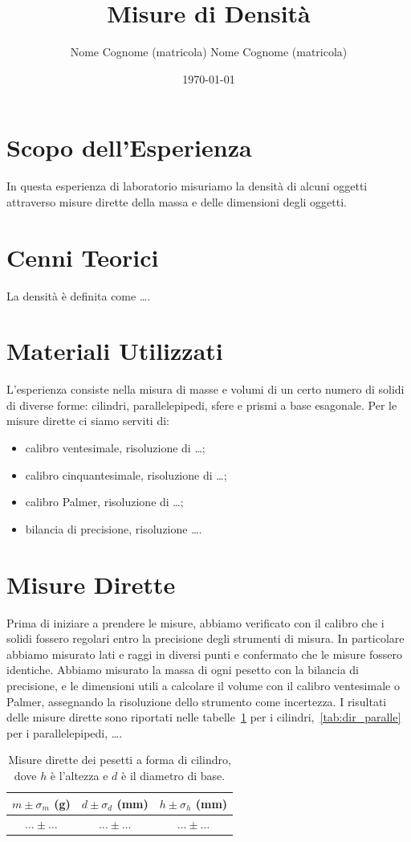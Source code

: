 \documentclass{article}
\title{Misure di Densit\`a}
\author{Nome Cognome (matricola)\quad
        Nome Cognome (matricola)}
\date{\today}
\begin{document}
\maketitle
\section{Scopo dell'Esperienza}
In questa esperienza di laboratorio misuriamo la densit\`a di alcuni oggetti attraverso misure dirette della massa e delle dimensioni degli oggetti.

\section{Cenni Teorici}
La densit\`a \`e definita come \ldots.

\section{Materiali Utilizzati}
L'esperienza consiste nella misura di masse e volumi di un certo numero di solidi di diverse forme: cilindri, parallelepipedi, sfere e prismi a base esagonale. Per le misure dirette ci siamo serviti di:
\begin{itemize}
    \item calibro ventesimale, risoluzione di \ldots;
    \item calibro cinquantesimale, risoluzione di \ldots;
    \item calibro Palmer, risoluzione di \ldots;
    \item bilancia di precisione, risoluzione \ldots.
\end{itemize}
\section{Misure Dirette}
Prima di iniziare a prendere le misure, abbiamo verificato con il calibro che i solidi fossero regolari entro la precisione degli strumenti di misura. In particolare abbiamo misurato lati e raggi in diversi punti e confermato che le misure fossero identiche.
Abbiamo misurato la massa di ogni pesetto con la bilancia di precisione, e le dimensioni utili a calcolare il volume con il calibro ventesimale o Palmer, assegnando la risoluzione dello strumento come incertezza. I risultati delle misure dirette sono riportati nelle tabelle~\ref{tab:dir_cilindri} per i cilindri,~\ref{tab:dir_paralle} per i parallelepipedi, \ldots.

\begin{table}[]
    \centering
    \begin{tabular}{c|c|c}
      $m\pm \sigma_m$ (g)   & $d\pm\sigma_d$ (mm)  & $h\pm\sigma_h$ (mm)\\
      \hline
     $\ldots \pm \ldots$    & $\ldots \pm \ldots$ &$\ldots \pm \ldots$\\
    \end{tabular}
    \caption{Misure dirette dei pesetti a forma di cilindro, dove $h$ \`e l'altezza e $d$ \`e il diametro di base.}
    \label{tab:dir_cilindri}
\end{table}
\end{document}
